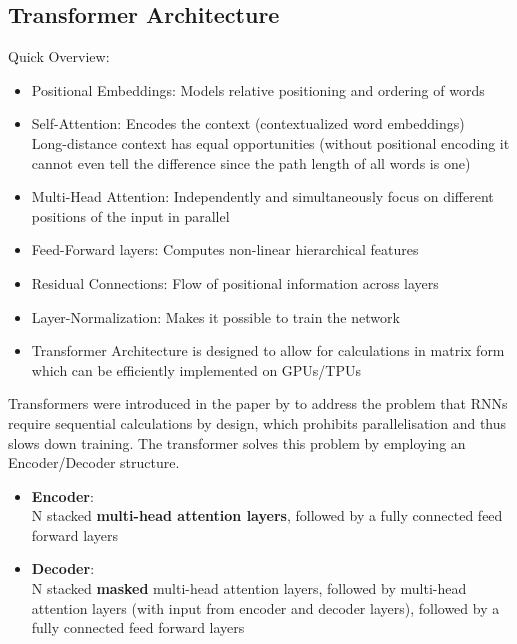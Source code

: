 \documentclass[11pt]{article}
\begin{document}
\subsection{Transformer Architecture}
Quick Overview:
\begin{itemize}
	\item Positional Embeddings: Models relative positioning and ordering of words
	\item Self-Attention: Encodes the context (contextualized word embeddings)\\
	Long-distance context has equal opportunities (without positional encoding it cannot even tell the difference since the path length of all words is one)
	\item Multi-Head Attention: Independently and simultaneously focus on different positions of the input in parallel
	\item Feed-Forward layers: Computes non-linear hierarchical features
	\item Residual Connections: Flow of positional information across layers
	\item Layer-Normalization: Makes it possible to train the network
	\item Transformer Architecture is designed to allow for calculations in matrix form which can be efficiently implemented on GPUs/TPUs
\end{itemize}
Transformers were introduced in the paper  by \citeauthor{vaswani2017attention} to address the problem that RNNs require sequential calculations by design, which prohibits parallelisation and thus slows down training. The transformer solves this problem by employing an Encoder/Decoder structure.
\begin{itemize}
	\item \textbf{Encoder}:\\
	N stacked \textbf{multi-head attention layers}, followed by a fully connected feed forward layers
	\item \textbf{Decoder}:\\
	N stacked \textbf{masked} multi-head attention layers, followed by multi-head attention layers (with input from encoder and decoder layers), followed by a fully connected feed forward layers
\end{itemize}
\end{document}
